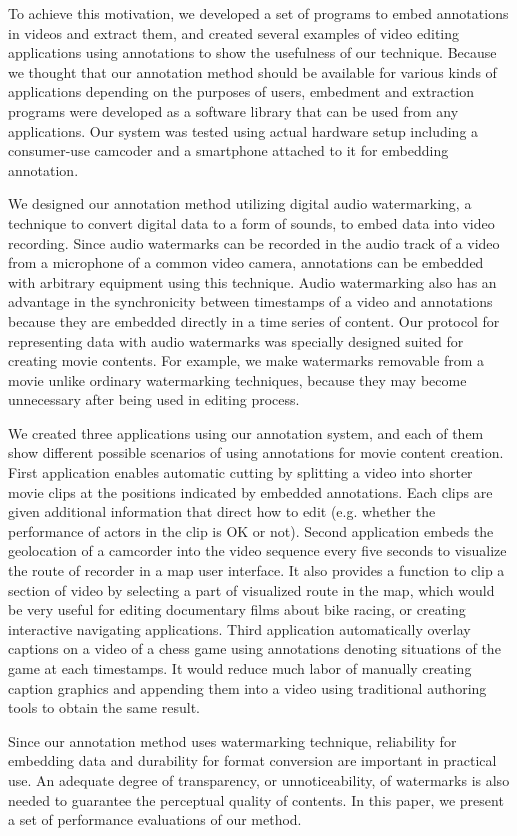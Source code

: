 To achieve this motivation, we developed a set of programs to embed annotations in videos and extract them, and created several examples of video editing applications using annotations to show the usefulness of our technique.
Because we thought that our annotation method should be available for various kinds of applications depending on the purposes of users, embedment and extraction programs were developed as a software library that can be used from any applications.
Our system was tested using actual hardware setup including a consumer-use camcoder and a smartphone attached to it for embedding annotation.

We designed our annotation method utilizing digital audio watermarking, a technique to convert digital data to a form of sounds, to embed data into video recording.
Since audio watermarks can be recorded in the audio track of a video from a microphone of a common video camera, annotations can be embedded with arbitrary equipment using this technique.
Audio watermarking also has an advantage in the synchronicity between timestamps of a video and annotations because they are embedded directly in a time series of content.
Our protocol for representing data with audio watermarks was specially designed suited for creating movie contents.
For example, we make watermarks removable from a movie unlike ordinary watermarking techniques, because they may become unnecessary after being used in editing process.

We created three applications using our annotation system, and each of them show different possible scenarios of using annotations for movie content creation.
First application enables automatic cutting by splitting a video into shorter movie clips at the positions indicated by embedded annotations.
Each clips are given additional information that direct how to edit (e.g. whether the performance of actors in the clip is OK or not).
Second application embeds the geolocation of a camcorder into the video sequence every five seconds to visualize the route of recorder in a map user interface.
It also provides a function to clip a section of video by selecting a part of visualized route in the map, which would be very useful for editing documentary films about bike racing, or creating interactive navigating applications.
Third application automatically overlay captions on a video of a chess game using annotations denoting situations of the game at each timestamps.
It would reduce much labor of manually creating caption graphics and appending them into a video using traditional authoring tools to obtain the same result.

Since our annotation method uses watermarking technique, reliability for embedding data and durability for format conversion are important in practical use.
An adequate degree of transparency, or unnoticeability, of watermarks is also needed to guarantee the perceptual quality of contents.
In this paper, we present a set of performance evaluations of our method.

